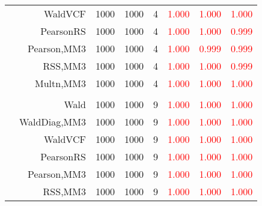 \documentclass[
]{article}
\begin{document}
\begin{table}[H]
{\begin{tabular}[t]{lrrrrrrr}
\hspace{1em} & WaldVCF & 1000 & 1000 & 4 & \textcolor{red}{1.000} & \textcolor{red}{1.000} & \textcolor{red}{1.000}\\

\hspace{1em} & PearsonRS & 1000 & 1000 & 4 & \textcolor{red}{1.000} & \textcolor{red}{1.000} & \textcolor{red}{0.999}\\

\hspace{1em} & Pearson,MM3 & 1000 & 1000 & 4 & \textcolor{red}{1.000} & \textcolor{red}{0.999} & \textcolor{red}{0.999}\\

\hspace{1em} & RSS,MM3 & 1000 & 1000 & 4 & \textcolor{red}{1.000} & \textcolor{red}{1.000} & \textcolor{red}{0.999}\\

\hspace{1em} & Multn,MM3 & 1000 & 1000 & 4 & \textcolor{red}{1.000} & \textcolor{red}{1.000} & \textcolor{red}{1.000}\\
\cmidrule{1-8}
\addlinespace[0.3em]
\multicolumn{8}{l}{\textbf{1F 15V}}\\
\hspace{1em} & Wald & 1000 & 1000 & 9 & \textcolor{red}{1.000} & \textcolor{red}{1.000} & \textcolor{red}{1.000}\\

\hspace{1em} & WaldDiag,MM3 & 1000 & 1000 & 9 & \textcolor{red}{1.000} & \textcolor{red}{1.000} & \textcolor{red}{1.000}\\

\hspace{1em} & WaldVCF & 1000 & 1000 & 9 & \textcolor{red}{1.000} & \textcolor{red}{1.000} & \textcolor{red}{1.000}\\

\hspace{1em} & PearsonRS & 1000 & 1000 & 9 & \textcolor{red}{1.000} & \textcolor{red}{1.000} & \textcolor{red}{1.000}\\

\hspace{1em} & Pearson,MM3 & 1000 & 1000 & 9 & \textcolor{red}{1.000} & \textcolor{red}{1.000} & \textcolor{red}{1.000}\\

\hspace{1em} & RSS,MM3 & 1000 & 1000 & 9 & \textcolor{red}{1.000} & \textcolor{red}{1.000} & \textcolor{red}{1.000}\\


\end{tabular}}
\end{table}
\end{document}
